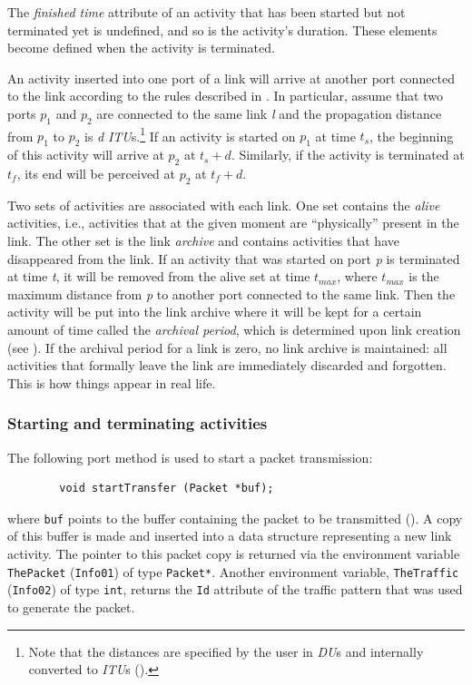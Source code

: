 The {\em finished time\/} attribute of
an activity that has been started but not terminated yet is undefined,
and so is the activity's duration.
These elements become defined when the activity is terminated.

An activity inserted into one port of a link will arrive at another port
connected to the link according to the rules described in .
In particular, assume that two ports $p_1$ and $p_2$ are
connected to the same link {\em l\/}
and the propagation distance from $p_1$ to $p_2$ is {\em d\/}
{\em ITU\/}s.\footnote{Note that the distances are specified by the user
in {\em DU\/}s and internally converted to {\em ITU\/}s ().}
If an activity is started on $p_1$ at time $t_s$, the beginning of this
activity will arrive at $p_2$ at $t_s + d$.
Similarly, if the activity is terminated at $t_f$,
its end will be perceived at $p_2$ at $t_f + d$.

Two sets of activities are associated with each link.
One set contains the {\em alive\/} activities, i.e., activities that at the
given moment are ``physically'' present in the link.
The other set is the link {\em archive\/} and contains activities that
have disappeared from the link.
If an activity that was started on port {\em p\/} is terminated at time {\em t}, it
will be removed from the alive set at time $t_{max}$,
where $t_{max}$ is the
maximum distance from {\em p\/} to another port connected to the same link.
Then the activity will be put into the link archive where it will be kept
for a certain amount of time called
the {\em archival period}, which is determined upon link creation
(see ).
If the archival period for a link is zero, no link archive is maintained:
all activities that formally leave the link are immediately discarded
and forgotten.
This is how things appear in real life.

\subsubsection{Starting and terminating activities}
\label{rm_po_ac_st}

The following port method is used to start a packet transmission:
\begin{verbatim}
        void startTransfer (Packet *buf);
\end{verbatim}
where {\tt buf} points to the buffer
containing the packet to be transmitted ().
A copy of this buffer is made and inserted into a data structure representing
a new link activity.
The pointer to this packet copy is returned via the environment
variable {\tt ThePacket} ({\tt Info01}) of type {\tt Packet*}.
Another environment variable, {\tt TheTraffic} ({\tt Info02}) of type
{\tt int}, returns the {\tt Id} attribute of the traffic pattern that was
used to generate the packet.

